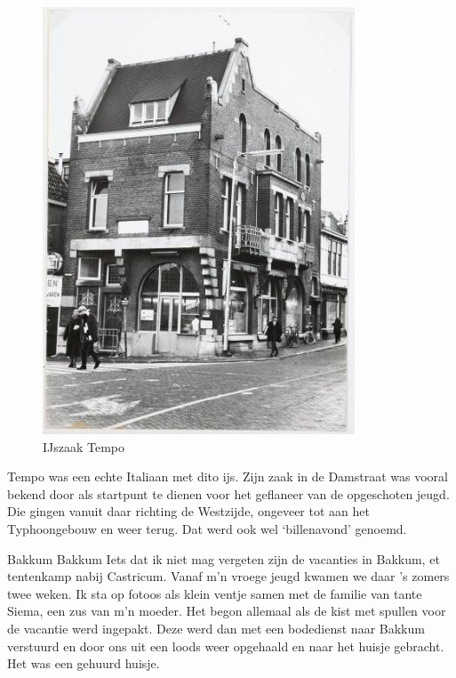 \documentclass[10pt,twoside, openright]{memoir}
\begin{document}
\begin{figure}
\includegraphics[width=\textwidth]{img/66tempo}
\caption*{\footnotesize IJszaak Tempo}
\end{figure}

Tempo was een echte Italiaan met dito ijs. Zijn zaak in de Damstraat was vooral bekend door als startpunt te dienen voor het geflaneer van de opgeschoten jeugd.  Die gingen vanuit daar richting de Westzijde, ongeveer tot aan het Typhoongebouw en weer terug. Dat werd ook wel ‘billenavond’ genoemd. 

Bakkum
Bakkum
Iets dat ik niet mag vergeten zijn de vacanties in Bakkum, et tentenkamp nabij Castricum. Vanaf m’n vroege jeugd kwamen we daar ’s zomers twee weken. Ik sta op fotoos als klein ventje samen met de familie van tante Siema, een zus van m’n moeder. Het begon allemaal als de kist met spullen voor de vacantie werd ingepakt. Deze werd dan met een bodedienst naar Bakkum verstuurd en door ons uit een loods weer opgehaald en naar het huisje gebracht. Het was een gehuurd huisje. 
\end{document}
